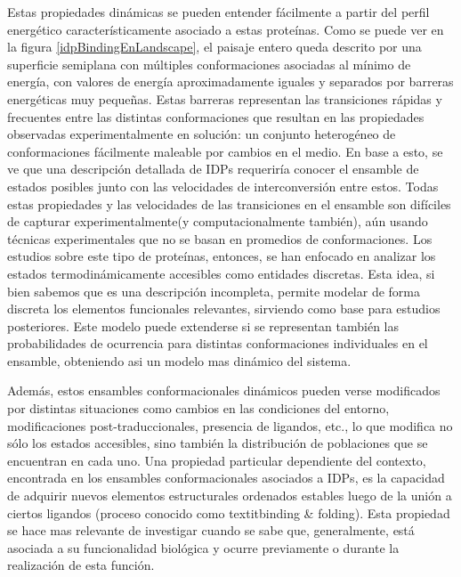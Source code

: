 Estas propiedades dinámicas se pueden entender fácilmente a partir del perfil energético característicamente asociado a estas proteínas.
Como se puede ver en la figura \ref{idpBindingEnLandscape}, el paisaje entero queda descrito por una superficie semiplana con múltiples conformaciones asociadas al mínimo de energía, 
con valores de energía aproximadamente iguales y separados por barreras energéticas muy pequeñas.
Estas barreras representan las transiciones rápidas y frecuentes entre las distintas conformaciones que resultan en las propiedades observadas experimentalmente
en solución: un conjunto heterogéneo de conformaciones fácilmente maleable por cambios en el medio. 
En base a esto, se ve que una descripción detallada de IDPs requeriría conocer el ensamble de estados posibles junto con las velocidades de interconversión entre estos.
Todas estas propiedades y las velocidades de las transiciones en el ensamble son difíciles de capturar experimentalmente(y computacionalmente también), aún usando técnicas experimentales que no se basan en promedios de conformaciones.
Los estudios sobre este tipo de proteínas, entonces, se han enfocado en analizar los estados termodinámicamente accesibles como entidades discretas.
Esta idea, si bien sabemos que es una descripción incompleta, permite modelar de forma discreta los elementos funcionales relevantes, sirviendo como base para estudios posteriores.
Este modelo puede extenderse si se representan también las probabilidades de ocurrencia para distintas conformaciones individuales en el ensamble, obteniendo asi un modelo mas dinámico del sistema.



Además, estos ensambles conformacionales dinámicos pueden verse modificados por distintas situaciones como cambios en las condiciones del entorno, modificaciones post-traduccionales, presencia de ligandos, etc.,
lo que modifica no sólo los estados accesibles, sino también la distribución de poblaciones que se encuentran en cada uno.
Una propiedad particular dependiente del contexto, encontrada en los ensambles conformacionales asociados a IDPs, es la capacidad de adquirir nuevos elementos estructurales ordenados estables luego de la unión a ciertos ligandos
(proceso conocido como textit{binding \& folding}\cite{dyson2005intrinsically}). 
Esta propiedad se hace mas relevante de investigar cuando se sabe que, generalmente, está asociada a su funcionalidad biológica y ocurre previamente o durante la realización de esta función.

